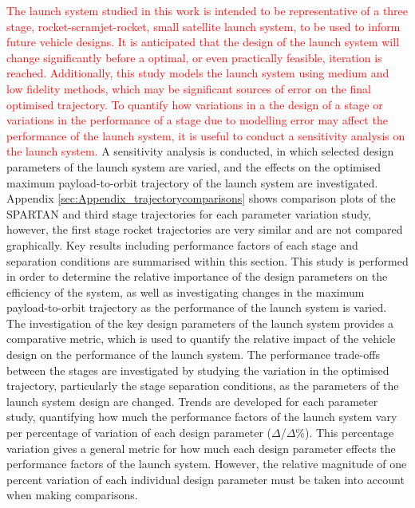 \textcolor{red}{The launch system studied in this work is intended to be representative of a three stage, rocket-scramjet-rocket, small satellite launch system, to be used to inform future vehicle designs. It is anticipated that the design of the launch system will change significantly before a optimal, or even practically feasible, iteration is reached. Additionally, this study models the launch system using medium and low fidelity methods, which may be significant sources of error on the final optimised trajectory.  
	To quantify how variations in a the design of a stage or variations in the performance of a stage due to modelling error may affect the performance of the launch system, it is useful to conduct a sensitivity analysis on the launch system.}
A sensitivity analysis is conducted, in which selected design parameters of the launch system are varied, and the effects on the optimised maximum payload-to-orbit trajectory of the launch system are investigated. Appendix \ref{sec:Appendix_trajectorycomparisons} shows comparison plots of the SPARTAN and third stage trajectories for each parameter variation study, however, the first stage rocket trajectories are very similar and are not compared graphically. Key results including performance factors of each stage and separation conditions are summarised within this section.
This study is performed in order to determine the relative importance of the design parameters on the efficiency of the system, as well as investigating changes in the maximum payload-to-orbit trajectory as the performance of the launch system is varied. The investigation of the key design parameters of the launch system provides a comparative metric, which is used to quantify the relative impact of the vehicle design on the performance of the launch system. The performance trade-offs between the stages are investigated by studying the variation in the optimised trajectory, particularly the stage separation conditions, as the parameters of the launch system design are changed. 
Trends are developed for each parameter study, quantifying how much the performance factors of the launch system vary per percentage of variation of each design parameter ($\Delta$/$\Delta$\%). This percentage variation gives a general metric for how much each design parameter effects the performance factors of the launch system. However, the relative magnitude of one percent variation of each individual design parameter must be taken into account when making comparisons. 


